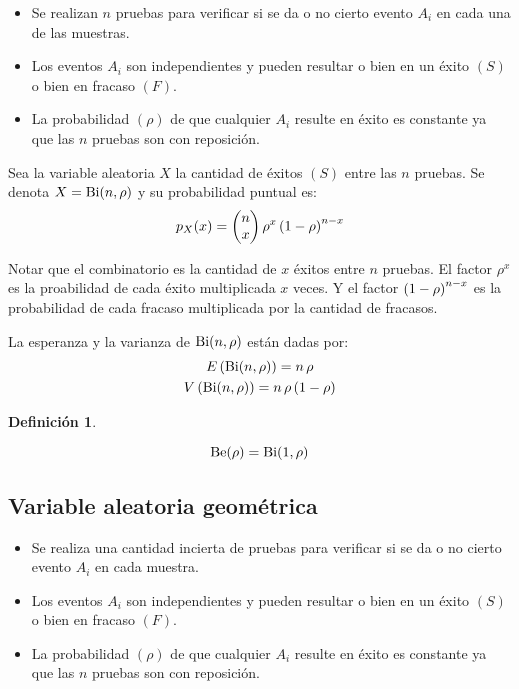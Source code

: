 \documentclass[a5paper,12pt,twoside]{book}
\newtheorem{defn}{{Definición}}[chapter]
\begin{document}
\begin{itemize}
\item Se realizan $n$ pruebas para verificar si se da o no cierto evento $A_i$ en cada una de las muestras.

\item Los eventos $A_i$ son independientes y pueden resultar o bien en un éxito $(S)$ o bien en fracaso $(F)$.

\item La probabilidad $(\rho)$ de que cualquier $A_i$ resulte en éxito es constante ya que las $n$ pruebas son con reposición.
\end{itemize}

Sea la variable aleatoria $X$ la cantidad de éxitos $(S)$ entre las $n$ pruebas.
Se denota $X=\operatorname{Bi}(n,\rho)$ y su probabilidad puntual es:
\begin{equation*}
p_X(x) = \begin{pmatrix} {n}\\{x} \end{pmatrix} \rho^x \left(1-\rho\right)^{n-x}
\end{equation*}

Notar que el combinatorio es la cantidad de $x$ éxitos entre $n$ pruebas.
El factor $\rho^x$ es la proabilidad de cada éxito multiplicada $x$ veces.
Y el factor $\left(1-\rho\right)^{n-x}$ es la probabilidad de cada fracaso multiplicada por la cantidad de fracasos.

La esperanza y la varianza de $\operatorname{Bi}(n,\rho)$ están dadas por:
\begin{gather*}
    E \left(\operatorname{Bi}(n,\rho)\right) = n \, \rho
    \\
    V \left(\operatorname{Bi}(n,\rho)\right) = n \, \rho \left(1-\rho\right)
\end{gather*}

\begin{mdframed}[style=MyFrame1]
    \begin{defn}
    \end{defn}
    \begin{equation*}
        \operatorname{Be}(\rho) = \operatorname{Bi}(1,\rho)
    \end{equation*}
\end{mdframed}


\subsection{Variable aleatoria geométrica}

\begin{itemize}
\item Se realiza una cantidad incierta de pruebas para verificar si se da o no cierto evento $A_i$ en cada muestra.

\item Los eventos $A_i$ son independientes y pueden resultar o bien en un éxito $(S)$ o bien en fracaso $(F)$.

\item La probabilidad $(\rho)$ de que cualquier $A_i$ resulte en éxito es constante ya que las $n$ pruebas son con reposición.
\end{itemize}
\end{document}
